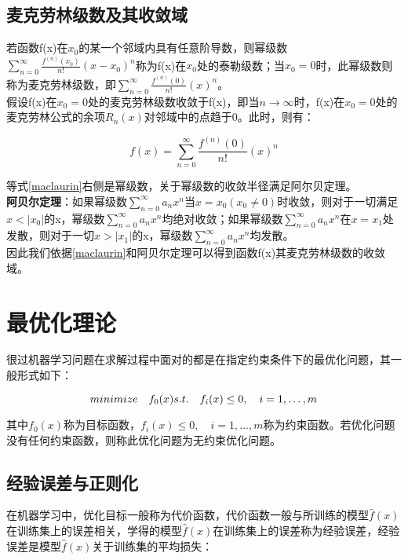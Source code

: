 \subsection{麦克劳林级数及其收敛域}
若函数f(x)在$x_0$的某一个邻域内具有任意阶导数，则幂级数$\sum_{n=0}^{\infty}{\frac{f^{\left( n \right)}\left( x_0 \right)}{n!}}\left( x-x_0 \right) ^n$称为f(x)在$x_0$处的泰勒级数；当$x_0=0$时，此幂级数则称为麦克劳林级数，即$\sum_{n=0}^{\infty}{\frac{f^{\left( n \right)}\left( 0 \right)}{n!}}\left( x \right) ^n$。\\
假设f(x)在$x_0=0$处的麦克劳林级数收敛于f(x)，即当$n\rightarrow \infty $时，f(x)在$x_0=0$处的麦克劳林公式的余项$R_n(x)$对邻域中的点趋于0。此时，则有：

\begin{equation}
\label{maclaurin}
f\left( x \right) =\sum_{n=0}^{\infty}{\frac{f^{\left( n \right)}\left( 0 \right)}{n!}}\left( x \right) ^n
\end{equation}

等式\ref{maclaurin}右侧是幂级数，关于幂级数的收敛半径满足阿尔贝定理。\\
\textbf{阿贝尔定理}：如果幂级数$\sum_{n=0}^{\infty}{a_nx^n}$当$x=x_0(x_0 \ne 0)$时收敛，则对于一切满足$x<|x_0|$的x，幂级数$\sum_{n=0}^{\infty}{a_nx^n}$均绝对收敛；如果幂级数$\sum_{n=0}^{\infty}{a_nx^n}$在$x=x_1$处发散，则对于一切$x>|x_1|$的x，幂级数$\sum_{n=0}^{\infty}{a_nx^n}$均发散。\\
因此我们依据\ref{maclaurin}和阿贝尔定理可以得到函数f(x)其麦克劳林级数的收敛域。





\section{最优化理论}
很过机器学习问题在求解过程中面对的都是在指定约束条件下的最优化问题，其一般形式如下：

\begin{equation}
minimize \quad f_{0}(x)$ \\$s.t. \quad f_{i}(x) \leq 0, \quad i=1, \ldots, m
\end{equation}

其中$f_0(x)$称为目标函数，$f_{i}(x) \leq 0, \quad i=1, \ldots, m$称为约束函数。若优化问题没有任何约束函数，则称此优化问题为无约束优化问题。

\subsection{经验误差与正则化}
在机器学习中，优化目标一般称为代价函数，代价函数一般与所训练的模型$\hat{f}\left( x \right) $在训练集上的误差相关，学得的模型$\hat{f}\left( x \right) $在训练集上的误差称为经验误差，经验误差是模型$\hat{f}\left( x \right) $关于训练集的平均损失：

